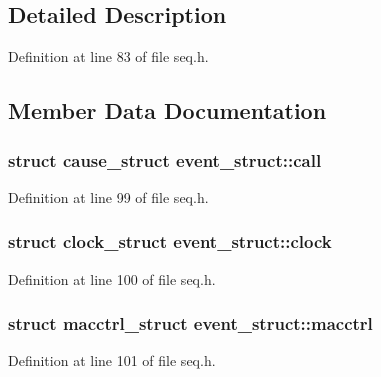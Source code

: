 \subsection{Detailed Description}


Definition at line 83 of file seq.\+h.



\subsection{Member Data Documentation}
\subsubsection[{\texorpdfstring{call}{call}}]{\setlength{\rightskip}{0pt plus 5cm}struct {\bf cause\+\_\+struct} event\+\_\+struct\+::call}\hypertarget{structevent__struct_af175686134558b827dbe2e686890196e}{}\label{structevent__struct_af175686134558b827dbe2e686890196e}


Definition at line 99 of file seq.\+h.

\subsubsection[{\texorpdfstring{clock}{clock}}]{\setlength{\rightskip}{0pt plus 5cm}struct {\bf clock\+\_\+struct} event\+\_\+struct\+::clock}\hypertarget{structevent__struct_aa7356ebe86a978c9901f24c35680e6d8}{}\label{structevent__struct_aa7356ebe86a978c9901f24c35680e6d8}


Definition at line 100 of file seq.\+h.

\subsubsection[{\texorpdfstring{macctrl}{macctrl}}]{\setlength{\rightskip}{0pt plus 5cm}struct {\bf macctrl\+\_\+struct} event\+\_\+struct\+::macctrl}\hypertarget{structevent__struct_a4bc36bc9c07a3509e68c385b2d0706af}{}\label{structevent__struct_a4bc36bc9c07a3509e68c385b2d0706af}


Definition at line 101 of file seq.\+h.

